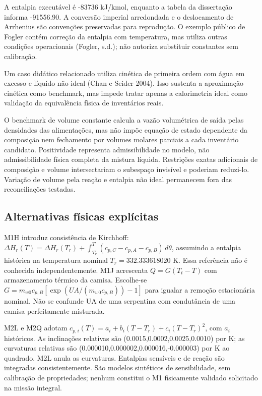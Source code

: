 \documentclass[
  11pt,
]{article}
\begin{document}
A entalpia executável é -83736 kJ/kmol, enquanto a tabela da dissertação
informa -91556.90. A conversão imperial arredondada e o deslocamento de
Arrhenius são convenções preservadas para reprodução. O exemplo público
de Fogler contém correção da entalpia com temperatura, mas utiliza
outras condições operacionais (Fogler, s.d.); não autoriza substituir
constantes sem calibração.

Um caso didático relacionado utiliza cinética de primeira ordem com água
em excesso e líquido não ideal (Chan e Seider 2004). Isso sustenta a
aproximação cinética como benchmark, mas impede tratar apenas a
calorimetria ideal como validação da equivalência física de inventários
reais.

O benchmark de volume constante calcula a vazão volumétrica de saída
pelas densidades das alimentações, mas não impõe equação de estado
dependente da composição nem fechamento por volumes molares parciais a
cada inventário candidato. Positividade representa admissibilidade no
modelo, não admissibilidade física completa da mistura líquida.
Restrições exatas adicionais de composição e volume intersectariam o
subespaço invisível e poderiam reduzi-lo. Variação de volume pela reação
e entalpia não ideal permanecem fora das reconciliações testadas.

\hypertarget{alternativas-fuxedsicas-expluxedcitas}{%
\subsection{Alternativas físicas
explícitas}\label{alternativas-fuxedsicas-expluxedcitas}}

M1H introduz consistência de Kirchhoff:
\(\Delta H_r(T)=\Delta H_r(T_r)+\int_{T_r}^T(c_{p,C}-c_{p,A}-c_{p,B})\,d\theta\),
assumindo a entalpia histórica na temperatura nominal
\(T_r=332.333618020\) K. Essa referência não é conhecida
independentemente. M1J acrescenta \(Q=G(T_t-T)\) com armazenamento
térmico da camisa. Escolhe-se
\(G=m_{w0}c_{p,B}[\exp(UA/(m_{w0}c_{p,B}))-1]\) para igualar a remoção
estacionária nominal. Não se confunde UA de uma serpentina com
condutância de uma camisa perfeitamente misturada.

M2L e M2Q adotam \(c_{p,i}(T)=a_i+b_i(T-T_r)+c_i(T-T_r)^2\), com \(a_i\)
históricos. As inclinações relativas são (0.0015,0.0002,0.0025,0.0010)
por K; as curvaturas relativas são
(0.000010,0.000002,0.000016,-0.000003) por K ao quadrado. M2L anula as
curvaturas. Entalpias sensíveis e de reação são integradas
consistentemente. São modelos sintéticos de sensibilidade, sem
calibração de propriedades; nenhum constitui o M1 fisicamente validado
solicitado na missão integral.
\end{document}
